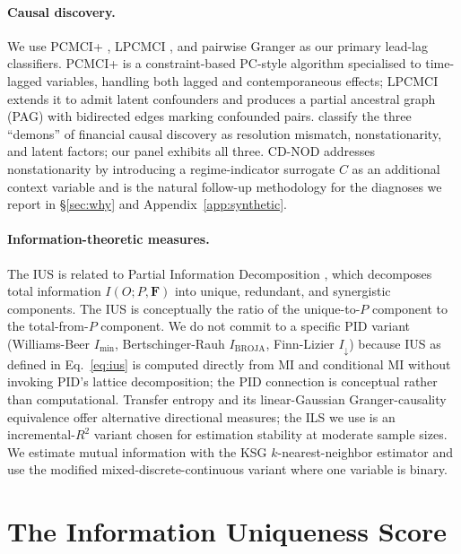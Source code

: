 \documentclass{article}
\begin{document}
\paragraph{Causal discovery.}
We use PCMCI+ \citep{runge2020discovering}, LPCMCI \citep{gerhardus2020high}, and pairwise Granger as our primary lead-lag classifiers. PCMCI+ is a constraint-based PC-style algorithm specialised to time-lagged variables, handling both lagged and contemporaneous effects; LPCMCI extends it to admit latent confounders and produces a partial ancestral graph (PAG) with bidirected edges marking confounded pairs. \citet{dong2024three} classify the three ``demons'' of financial causal discovery as resolution mismatch, nonstationarity, and latent factors; our panel exhibits all three. CD-NOD \citep{huang2020causal} addresses nonstationarity by introducing a regime-indicator surrogate $C$ as an additional context variable and is the natural follow-up methodology for the diagnoses we report in \S\ref{sec:why} and Appendix~\ref{app:synthetic}.

\paragraph{Information-theoretic measures.}
The IUS is related to Partial Information Decomposition \citep{williams2010nonnegative}, which decomposes total information $I(O; P, \mathbf{F})$ into unique, redundant, and synergistic components. The IUS is conceptually the ratio of the unique-to-$P$ component to the total-from-$P$ component. We do not commit to a specific PID variant (Williams-Beer $I_\text{min}$, Bertschinger-Rauh $I_\text{BROJA}$, Finn-Lizier $I_\downarrow$) because IUS as defined in Eq.~\eqref{eq:ius} is computed directly from MI and conditional MI without invoking PID's lattice decomposition; the PID connection is conceptual rather than computational. Transfer entropy \citep{schreiber2000measuring} and its linear-Gaussian Granger-causality equivalence \citep{barnett2009granger} offer alternative directional measures; the ILS we use is an incremental-$R^2$ variant chosen for estimation stability at moderate sample sizes. We estimate mutual information with the KSG $k$-nearest-neighbor estimator \citep{kraskov2004estimating} and use the modified mixed-discrete-continuous variant \citep{ross2014mutual} where one variable is binary.

\section{The Information Uniqueness Score}
\label{sec:ius_def}
\end{document}
